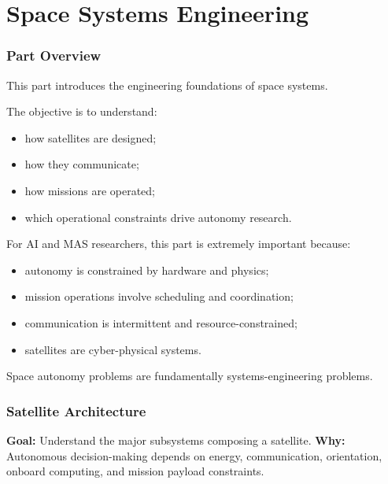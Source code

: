 \documentclass[10pt,a4paper,twocolumn]{article}
\newcommand{\lesson}[3]{
\section{#1}
\noindent
\textbf{Goal:} #2 \newline
\textbf{Why:} #3
\vspace{0.1em}
}
\begin{document}
\part{Space Systems Engineering}


\section*{Part Overview}

This part introduces the engineering foundations of space systems.

The objective is to understand:
\begin{itemize}
    \item how satellites are designed;
    \item how they communicate;
    \item how missions are operated;
    \item which operational constraints drive autonomy research.
\end{itemize}

For AI and MAS researchers, this part is extremely important because:
\begin{itemize}
    \item autonomy is constrained by hardware and physics;
    \item mission operations involve scheduling and coordination;
    \item communication is intermittent and resource-constrained;
    \item satellites are cyber-physical systems.
\end{itemize}

\begin{keybox}
    Space autonomy problems are fundamentally systems-engineering problems.
\end{keybox}



\lesson
{Satellite Architecture}
{Understand the major subsystems composing a satellite.}
{Autonomous decision-making depends on energy, communication, orientation, onboard computing, and mission payload constraints.}

\end{document}
